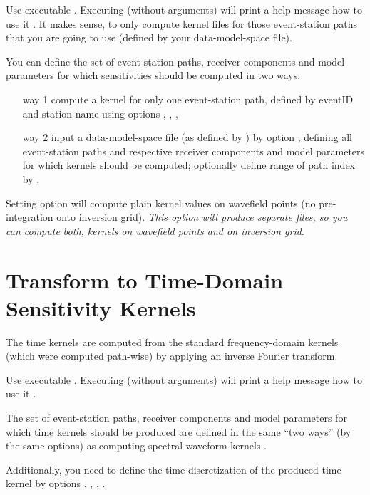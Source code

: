 Use executable . Executing  (without arguments) 
will print a help message how to use it .
It makes sense, to only compute kernel files for those event-station paths that you are going to use (defined by
your data-model-space file).

You can define the set of event-station paths, receiver components and model parameters for which 
sensitivities should be computed in two ways:
\begin{itemize}
\item[way 1] compute a kernel for only one event-station path, defined by eventID and station name using options 
, , , 
\item[way 2] input a data-model-space file (as defined by ) by option 
, defining all event-station paths and respective receiver components and model parameters 
for which kernels should be computed; optionally define range of path index
by , 
\end{itemize}
Setting option  will compute plain kernel values on wavefield points (no pre-integration onto inversion
grid). \emph{This option will produce separate files, so you can compute both, kernels on wavefield points and
on inversion grid}.
%
\section{Transform to Time-Domain Sensitivity Kernels} \label{basic_steps,sec:compute_time_kernels}
%
The time kernels are computed from the standard frequency-domain kernels (which were computed path-wise)
by applying an inverse Fourier transform. 

Use executable . Executing  (without arguments) will print a 
help message how to use it .

The set of event-station paths, receiver components and model parameters for which time kernels should be produced
are defined in the same ``two ways'' (by the same options) as computing spectral waveform kernels 
.

Additionally, you need to define the time discretization of the produced time kernel by options 
, , , .
%
